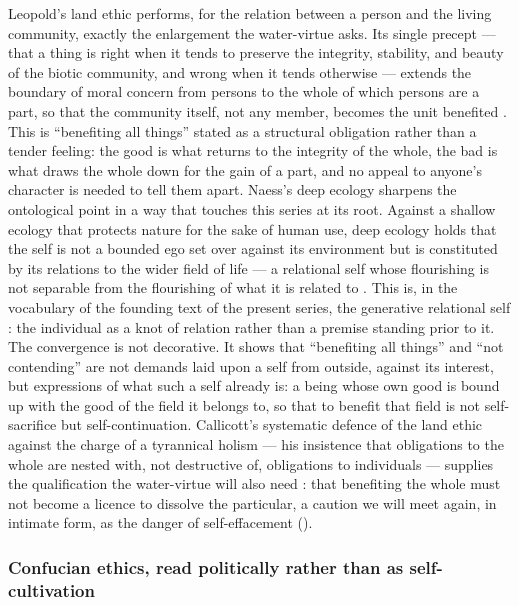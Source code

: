 Leopold's land ethic performs, for the relation between a person and the living community, exactly the enlargement the water-virtue asks. Its single precept --- that a thing is right when it tends to preserve the integrity, stability, and beauty of the biotic community, and wrong when it tends otherwise --- extends the boundary of moral concern from persons to the whole of which persons are a part, so that the community itself, not any member, becomes the unit benefited \parencite{leopold1949}. This is ``benefiting all things'' stated as a structural obligation rather than a tender feeling: the good is what returns to the integrity of the whole, the bad is what draws the whole down for the gain of a part, and no appeal to anyone's character is needed to tell them apart. Naess's deep ecology sharpens the ontological point in a way that touches this series at its root. Against a shallow ecology that protects nature for the sake of human use, deep ecology holds that the self is not a bounded ego set over against its environment but is constituted by its relations to the wider field of life --- a relational self whose flourishing is not separable from the flourishing of what it is related to \parencite{naess1973}. This is, in the vocabulary of the founding text of the present series, the generative relational self \parencite{wan2024grb}: the individual as a knot of relation rather than a premise standing prior to it. The convergence is not decorative. It shows that ``benefiting all things'' and ``not contending'' are not demands laid upon a self from outside, against its interest, but expressions of what such a self already is: a being whose own good is bound up with the good of the field it belongs to, so that to benefit that field is not self-sacrifice but self-continuation. Callicott's systematic defence of the land ethic against the charge of a tyrannical holism --- his insistence that obligations to the whole are nested with, not destructive of, obligations to individuals --- supplies the qualification the water-virtue will also need \parencite{callicott1989}: that benefiting the whole must not become a licence to dissolve the particular, a caution we will meet again, in intimate form, as the danger of self-effacement ().

\subsubsection{Confucian ethics, read politically rather than as self-cultivation}
\label{p20:ssub:review-confucian}

